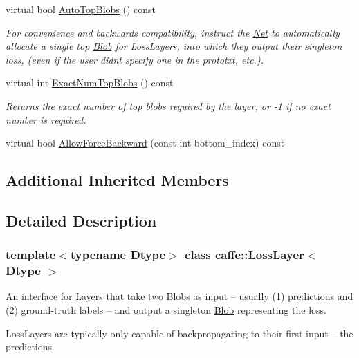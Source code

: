 \begin{DoxyCompactItemize}
\mbox{\label{classcaffe_1_1_loss_layer_ae98a9942cdb1c67e09d45cc2d876618e}} 
virtual bool \mbox{\hyperlink{classcaffe_1_1_loss_layer_ae98a9942cdb1c67e09d45cc2d876618e}{Auto\+Top\+Blobs}} () const
\begin{DoxyCompactList}\small\item\em For convenience and backwards compatibility, instruct the \mbox{\hyperlink{classcaffe_1_1_net}{Net}} to automatically allocate a single top \mbox{\hyperlink{classcaffe_1_1_blob}{Blob}} for Loss\+Layers, into which they output their singleton loss, (even if the user didn\textquotesingle{}t specify one in the prototxt, etc.). \end{DoxyCompactList}\item 
virtual int \mbox{\hyperlink{classcaffe_1_1_loss_layer_aa5d5ab714a14082f5343dc9c49025b23}{Exact\+Num\+Top\+Blobs}} () const
\begin{DoxyCompactList}\small\item\em Returns the exact number of top blobs required by the layer, or -\/1 if no exact number is required. \end{DoxyCompactList}\item 
virtual bool \mbox{\hyperlink{classcaffe_1_1_loss_layer_a36d35155bfe0de53a79c517f33759612}{Allow\+Force\+Backward}} (const int bottom\+\_\+index) const
\end{DoxyCompactItemize}
\subsection*{Additional Inherited Members}


\subsection{Detailed Description}
\subsubsection*{template$<$typename Dtype$>$\newline
class caffe\+::\+Loss\+Layer$<$ Dtype $>$}

An interface for \mbox{\hyperlink{classcaffe_1_1_layer}{Layer}}s that take two \mbox{\hyperlink{classcaffe_1_1_blob}{Blob}}s as input -- usually (1) predictions and (2) ground-\/truth labels -- and output a singleton \mbox{\hyperlink{classcaffe_1_1_blob}{Blob}} representing the loss. 

Loss\+Layers are typically only capable of backpropagating to their first input -- the predictions. 

